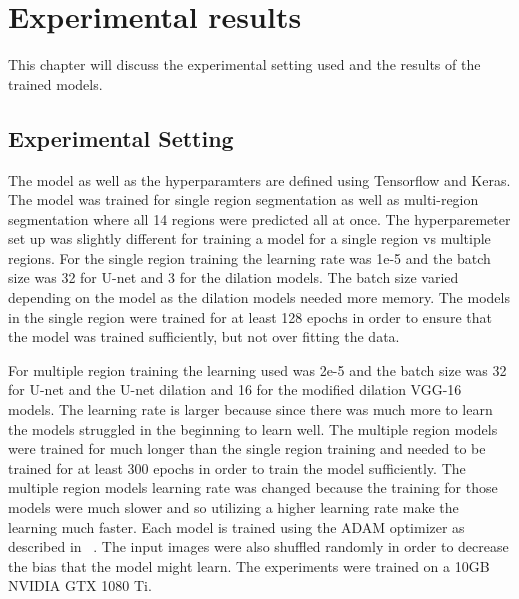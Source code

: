 \chapter{Experimental results}
    This chapter will discuss the experimental setting used and the results of the trained models.
\section{Experimental Setting}
    The model as well as the hyperparamters are defined using Tensorflow and Keras. 
    The model was trained for single region segmentation as well as multi-region segmentation where all 14 regions were predicted all at once.
    The hyperparemeter set up was slightly different for training a model for a single region vs multiple regions. 
    For the single region training the learning rate was 1e-5 and the batch size was 32 for U-net and 3 for the dilation models. 
    The batch size varied depending on the model as the dilation models needed more memory.  
    The models in the single region were trained for at least 128 epochs in order to ensure that the model was trained sufficiently, but not over fitting the data. 
    
    For multiple region training the learning used was 2e-5 and the batch size was 32 for U-net and the U-net dilation and 16 for the modified dilation VGG-16 models. 
    The learning rate is larger because since there was much more to learn the models struggled in the beginning to learn well.
    The multiple region models were trained for much longer than the single region training and needed to be trained for at least 300 epochs in order to train the model sufficiently.
    The multiple region models learning rate was changed because the training for those models were much slower and so utilizing a higher learning rate make the learning much faster.
    Each model is trained using the ADAM optimizer as described in ~\cite{Kingma2014AdamAM}. 
    The input images were also shuffled randomly in order to decrease the bias that the model might learn. 
    The experiments were trained on a 10GB NVIDIA GTX 1080 Ti. 
    
